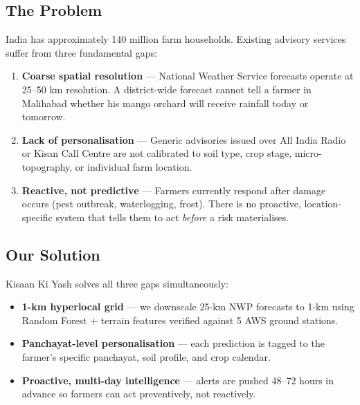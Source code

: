 \documentclass[12pt,a4paper]{article}
\begin{document}
\subsection{The Problem}

India has approximately 140 million farm households. Existing advisory services suffer from three fundamental gaps:

\begin{enumerate}[leftmargin=*]
  \item \textbf{Coarse spatial resolution} --- National Weather Service forecasts operate at 25--50 km resolution. A district-wide forecast cannot tell a farmer in Malihabad whether his mango orchard will receive rainfall today or tomorrow.
  \item \textbf{Lack of personalisation} --- Generic advisories issued over All India Radio or Kisan Call Centre are not calibrated to soil type, crop stage, micro-topography, or individual farm location.
  \item \textbf{Reactive, not predictive} --- Farmers currently respond after damage occurs (pest outbreak, waterlogging, frost). There is no proactive, location-specific system that tells them to act \textit{before} a risk materialises.
\end{enumerate}

\subsection{Our Solution}

Kisaan Ki Yash solves all three gaps simultaneously:

\begin{itemize}[leftmargin=*]
  \item \textbf{1-km hyperlocal grid} --- we downscale 25-km NWP forecasts to 1-km using Random Forest + terrain features verified against 5 AWS ground stations.
  \item \textbf{Panchayat-level personalisation} --- each prediction is tagged to the farmer's specific panchayat, soil profile, and crop calendar.
  \item \textbf{Proactive, multi-day intelligence} --- alerts are pushed 48--72 hours in advance so farmers can act preventively, not reactively.
\end{itemize}

\end{document}
